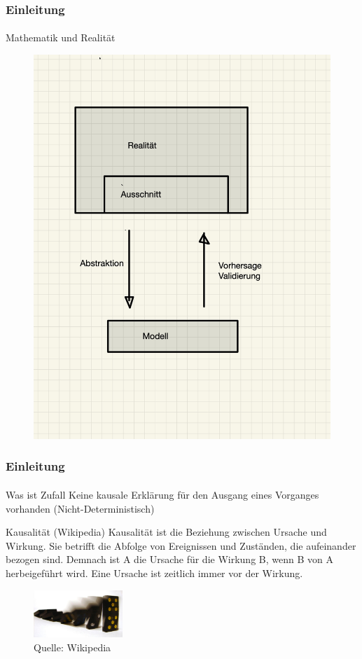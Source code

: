\documentclass{beamer}
\begin{document}
\begin{frame}
    \frametitle{Einleitung}
\framesubtitle{}
    \begin{block}{Mathematik und Realität}

\begin{figure}[htp]
      \centering
    \includegraphics[width=0.5 \textwidth]{img/modellierung}

 
\end{figure}
\end{block}
 
 \end{frame}


\begin{frame}
    \frametitle{Einleitung}
\framesubtitle{}

    \begin{block}{Was ist Zufall}
Keine kausale Erklärung für den Ausgang eines Vorganges vorhanden (Nicht-Deterministisch)
\end{block}



   \begin{block}{Kausalität (Wikipedia)}
Kausalität ist die Beziehung zwischen Ursache und Wirkung. Sie betrifft die Abfolge von Ereignissen und Zuständen, die aufeinander bezogen sind. Demnach ist A die Ursache für die Wirkung B, wenn B von A herbeigeführt wird.
Eine Ursache ist zeitlich immer vor der Wirkung.
\end{block}

\begin{figure}[htp]
      \centering
    \includegraphics[width=0.3\textwidth]{img/Domino}

      \caption{Quelle: Wikipedia}
\end{figure}


\end{frame}
\end{document}
